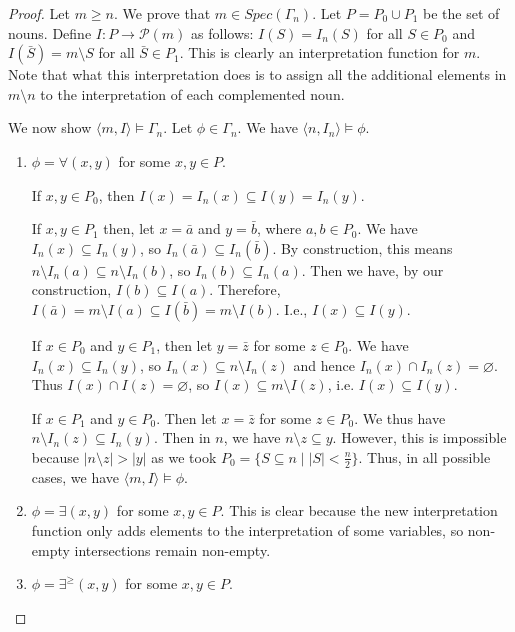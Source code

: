\documentclass[12pt, reqno]{amsart}
\theoremstyle{definition}
\theoremstyle{remark}
\numberwithin{equation}{section}
\begin{document}
\begin{proof}
	Let $m \geq n$. We prove that $m \in Spec(\Gamma_n)$. Let $P = P_0 \cup P_1$ be the set of nouns. Define $I: P \to \mathcal{P}(m)$ as follows: $I(S) = I_n(S)$ for all $S \in P_0$ and $I(\bar{S}) = m \setminus S$ for all $\bar{S} \in P_1$. This is clearly an interpretation function for $m$. Note that what this interpretation does is to assign all the additional elements in $m \setminus n$ to the interpretation of each complemented noun.
	
	We now show $\langle m, I\rangle \models \Gamma_n$. Let $\phi \in \Gamma_n$. We have $\langle n, I_n\rangle \models \phi$. 
	
	\begin{enumerate} 
 		 \item $\phi = \forall(x, y)$ for some $x, y \in P$. 
		 
		 If $x, y \in P_0$, then $I(x) = I_n(x) \subseteq I(y) = I_n(y)$. 
		 
		 If $x, y \in P_1$ then, let $x = \bar{a}$ and $y = \bar{b}$, where $a, b \in P_0$. We have $I_n(x) \subseteq I_n(y)$, so $I_n(\bar{a}) \subseteq I_n(\bar{b})$. By construction, this means $n \setminus I_n(a) \subseteq n \setminus I_n(b)$, so  $I_n(b) \subseteq I_n(a)$. Then we have, by our construction,  $I(b) \subseteq I(a)$. Therefore, $I(\bar{a}) = m \setminus I(a) \subseteq I(\bar{b}) = m \setminus I(b)$. I.e., $I(x) \subseteq I(y)$.
		 
		 If $x \in P_0$ and $y \in P_1$, then let $y = \bar{z}$ for some $z \in P_0$. We have $I_n(x) \subseteq I_n(y)$, so $I_n(x) \subseteq n \setminus I_n(z)$ and hence $I_n(x) \cap I_n(z) = \varnothing$. Thus $I(x) \cap I(z) = \varnothing$, so $I(x) \subseteq m \setminus I(z)$, i.e. $I(x) \subseteq I(y)$. 
		 
		 If $x \in P_1$ and $y \in P_0$. Then let $x = \bar{z}$ for some $z \in P_0$. We thus have $n \setminus I_n(z) \subseteq I_n(y)$. Then in $n$, we have $n \setminus z \subseteq y$. However, this is impossible because $|n \setminus z| > |y|$ as we took $P_{0} = \{S \subseteq n \mid |S| < \frac{n}{2}\}$. 
		 Thus, in all possible cases, we have $\langle m, I\rangle \models \phi$. 
		 \item $\phi = \exists(x, y)$ for some $x, y \in P$. This is clear because the new interpretation function only adds elements to the interpretation of some variables, so non-empty intersections remain non-empty. 
 		 \item $\phi = \exists^{\geq}(x, y)$ for some $x, y \in P$. 
		 

\end{enumerate}
\end{proof}
\end{document}
